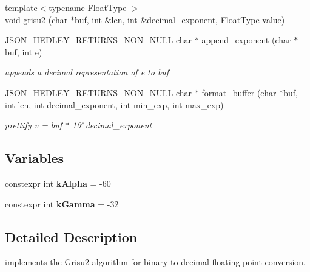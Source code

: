 \begin{DoxyCompactItemize}
\item 
{\footnotesize template$<$typename Float\+Type $>$ }\\void \mbox{\hyperlink{namespacenlohmann_1_1detail_1_1dtoa__impl_aab7a9670a4f4704a5d0347ad7588576b}{grisu2}} (char $\ast$buf, int \&len, int \&decimal\+\_\+exponent, Float\+Type value)
\item 
J\+S\+O\+N\+\_\+\+H\+E\+D\+L\+E\+Y\+\_\+\+R\+E\+T\+U\+R\+N\+S\+\_\+\+N\+O\+N\+\_\+\+N\+U\+LL char $\ast$ \mbox{\hyperlink{namespacenlohmann_1_1detail_1_1dtoa__impl_ad90f19ed10d8133b727df4b9bc5ddf5c}{append\+\_\+exponent}} (char $\ast$buf, int e)
\begin{DoxyCompactList}\small\item\em appends a decimal representation of e to buf \end{DoxyCompactList}\item 
J\+S\+O\+N\+\_\+\+H\+E\+D\+L\+E\+Y\+\_\+\+R\+E\+T\+U\+R\+N\+S\+\_\+\+N\+O\+N\+\_\+\+N\+U\+LL char $\ast$ \mbox{\hyperlink{namespacenlohmann_1_1detail_1_1dtoa__impl_ab441f2761e33839ca48bc2225e14a2a9}{format\+\_\+buffer}} (char $\ast$buf, int len, int decimal\+\_\+exponent, int min\+\_\+exp, int max\+\_\+exp)
\begin{DoxyCompactList}\small\item\em prettify v = buf $\ast$ 10$^\wedge$decimal\+\_\+exponent \end{DoxyCompactList}\end{DoxyCompactItemize}
\subsection*{Variables}
\begin{DoxyCompactItemize}
\item 
\mbox{\label{namespacenlohmann_1_1detail_1_1dtoa__impl_ac1ea1316de0b4a219f707c76b1db1966}} 
constexpr int {\bfseries k\+Alpha} = -\/60
\item 
\mbox{\label{namespacenlohmann_1_1detail_1_1dtoa__impl_a4a750fcc38da1ce68b7e25ab3a230e20}} 
constexpr int {\bfseries k\+Gamma} = -\/32
\end{DoxyCompactItemize}


\subsection{Detailed Description}
implements the Grisu2 algorithm for binary to decimal floating-\/point conversion. 


